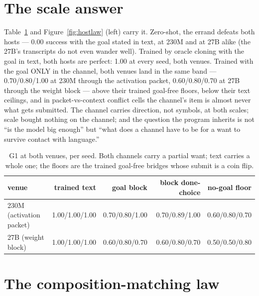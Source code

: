 \documentclass[11pt]{article}
\begin{document}
\section{The scale answer}

Table~\ref{tab:g1} and Figure~\ref{fig:hostlaw} (left) carry it.
Zero-shot, the errand defeats both hosts --- 0.00 success with the goal
stated in text, at 230M and at 27B alike (the 27B's transcripts do not
even wander well). Trained by oracle cloning with the goal in text,
both hosts are perfect: 1.00 at every seed, both venues. Trained with
the goal ONLY in the channel, both venues land in the same band ---
0.70/0.80/1.00 at 230M through the activation packet,
0.60/0.80/0.70 at 27B through the weight block --- above their
trained goal-free floors, below their text ceilings, and in
packet-vs-context conflict cells the channel's item is almost never
what gets submitted. The channel carries direction, not symbols, at
both scales; scale bought nothing on the channel; and the question the
program inherits is not ``is the model big enough'' but ``what does a
channel have to be for a want to survive contact with language.''

\begin{table}[t]
\centering
\small
\setlength{\tabcolsep}{5pt}
\begin{tabular}{lrrrr}
\toprule
venue & trained text & goal block & block done-choice & no-goal floor \\
\midrule
230M (activation packet) & 1.00/1.00/1.00 & 0.70/0.80/1.00 & 0.70/0.89/1.00 & 0.60/0.80/0.70 \\
27B (weight block) & 1.00/1.00/1.00 & 0.60/0.80/0.70 & 0.60/0.80/0.70 & 0.50/0.50/0.80 \\
\bottomrule
\end{tabular}
\caption{G1 at both venues, per seed. Both channels carry a partial
want; text carries a whole one; the floors are the trained goal-free
bridges whose submit is a coin flip.}
\label{tab:g1}
\end{table}

\section{The composition-matching law}
\end{document}

